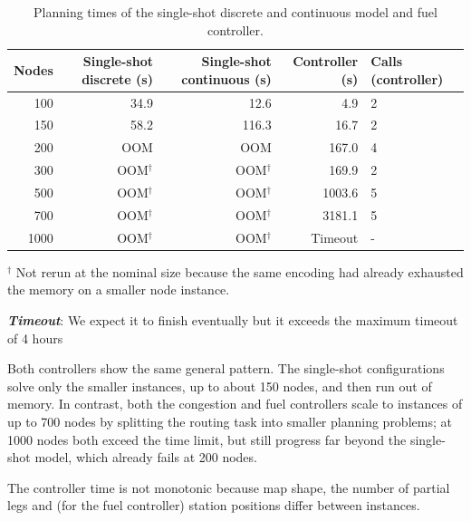 \documentclass[10pt]{article}
\begin{document}
\begin{table}[H]
\centering


\caption{Planning times of the single-shot discrete and continuous model and fuel controller.}
\label{tab:fuel-controller}
\begin{tabular}{rrrrl}
\toprule
Nodes & Single-shot discrete (s) & Single-shot continuous (s) & Controller (s) & Calls (controller) \\
\midrule
100  & 34.9          & 12.6          & 4.9               & 2 \\
150  & 58.2          & 116.3         & 16.7              & 2 \\
200  & OOM           & OOM           & 167.0             & 4 \\
300  & OOM$^\dagger$ & OOM$^\dagger$ & 169.9             & 2 \\
500  & OOM$^\dagger$ & OOM$^\dagger$ & 1003.6            & 5 \\
700  & OOM$^\dagger$ & OOM$^\dagger$ & 3181.1            & 5 \\
1000 & OOM$^\dagger$ & OOM$^\dagger$ & Timeout           & - \\
\bottomrule
\end{tabular}

\vspace{0.25em}
\begin{minipage}{0.95\linewidth}
\footnotesize
$^\dagger$ Not rerun at the nominal size because the same encoding had already
exhausted the memory on a smaller node instance.
\end{minipage}
\begin{minipage}{0.95\linewidth}
\footnotesize
\textit{\textbf{Timeout}}: We expect it to finish eventually but it exceeds the maximum timeout of 4 hours
\end{minipage}
\end{table}

Both controllers show the same general pattern. The single-shot configurations
solve only the smaller instances, up to about 150 nodes, and then run out
of memory. In contrast, both the congestion and fuel controllers scale to instances of up to 700 nodes by splitting the routing task into smaller planning problems; at 1000 nodes both exceed the time limit, but still progress far beyond the single-shot model, which already fails at 200 nodes.

The controller time is not monotonic because map shape,
the number of partial legs and (for the fuel controller) station positions differ between instances.
\end{document}
